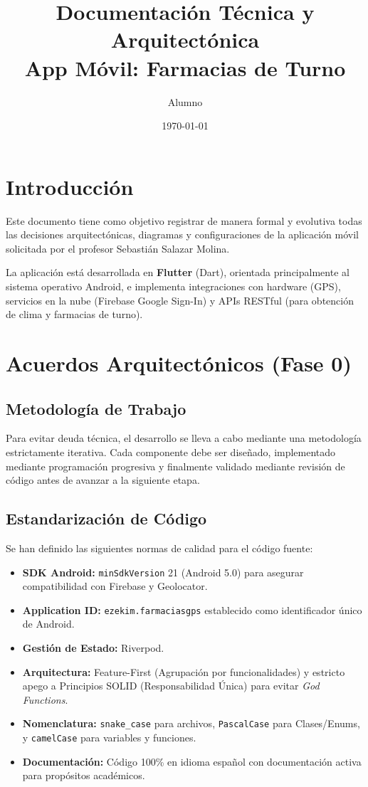\documentclass[12pt,a4paper]{article}
\title{Documentación Técnica y Arquitectónica\\ \large App Móvil: Farmacias de Turno}
\author{Alumno}
\date{\today}
\begin{document}
\maketitle
\tableofcontents
\newpage

\section{Introducción}
Este documento tiene como objetivo registrar de manera formal y evolutiva todas las decisiones arquitectónicas, diagramas y configuraciones de la aplicación móvil solicitada por el profesor Sebastián Salazar Molina.

La aplicación está desarrollada en \textbf{Flutter} (Dart), orientada principalmente al sistema operativo Android, e implementa integraciones con hardware (GPS), servicios en la nube (Firebase Google Sign-In) y APIs RESTful (para obtención de clima y farmacias de turno).

\section{Acuerdos Arquitectónicos (Fase 0)}
\subsection{Metodología de Trabajo}
Para evitar deuda técnica, el desarrollo se lleva a cabo mediante una metodología estrictamente iterativa. Cada componente debe ser diseñado, implementado mediante programación progresiva y finalmente validado mediante revisión de código antes de avanzar a la siguiente etapa.

\subsection{Estandarización de Código}
Se han definido las siguientes normas de calidad para el código fuente:
\begin{itemize}
    \item \textbf{SDK Android:} \texttt{minSdkVersion} 21 (Android 5.0) para asegurar compatibilidad con Firebase y Geolocator.
    \item \textbf{Application ID:} \texttt{ezekim.farmaciasgps} establecido como identificador único de Android.
    \item \textbf{Gestión de Estado:} Riverpod.
    \item \textbf{Arquitectura:} Feature-First (Agrupación por funcionalidades) y estricto apego a Principios SOLID (Responsabilidad Única) para evitar \textit{God Functions}.
    \item \textbf{Nomenclatura:} \texttt{snake\_case} para archivos, \texttt{PascalCase} para Clases/Enums, y \texttt{camelCase} para variables y funciones.
    \item \textbf{Documentación:} Código 100\% en idioma español con documentación activa para propósitos académicos.
\end{itemize}
\end{document}
